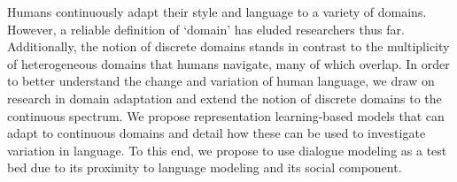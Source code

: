 Humans continuously adapt their style and language to a variety of domains. However, a reliable definition of `domain' has eluded researchers thus far. Additionally, the notion of discrete domains stands in contrast to the multiplicity of heterogeneous domains that humans navigate, many of which overlap. In order to better understand the change and variation of human language, we draw on research in domain adaptation and extend the notion of discrete domains to the continuous spectrum. We propose representation learning-based models that can adapt to continuous domains and detail how these can be used to investigate variation in language. To this end, we propose to use dialogue modeling as a test bed due to its proximity to language modeling and its social component.
